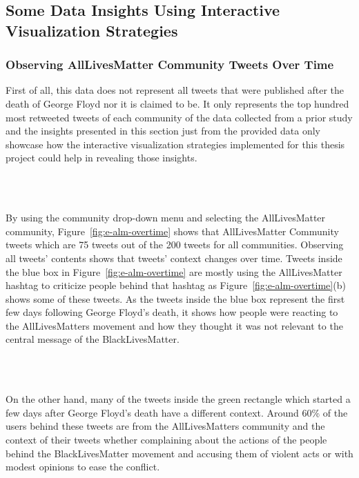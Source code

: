


\subsection{Some Data Insights Using Interactive Visualization Strategies}

\subsubsection{Observing AllLivesMatter Community Tweets Over Time}

First of all, this data does not represent all tweets that were published after the death of George Floyd nor it is claimed to be. It only represents the top hundred most retweeted tweets of each community of the data collected from a prior study and the insights presented in this section just from the provided data only showcase how the interactive visualization strategies implemented for this thesis project could help in revealing those insights. 

\\\

By using the community drop-down menu and selecting the AllLivesMatter community, Figure~\ref{fig:e-alm-overtime} shows that AllLivesMatter Community tweets which are 75 tweets out of the 200 tweets for all communities. Observing all tweets' contents shows that tweets' context changes over time. Tweets inside the blue box in Figure~\ref{fig:e-alm-overtime} are mostly using the AllLivesMatter hashtag to criticize people behind that hashtag as Figure~\ref{fig:e-alm-overtime}(b) shows some of these tweets. As the tweets inside the blue box represent the first few days following George Floyd's death, it shows how people were reacting to the AllLivesMatters movement and how they thought it was not relevant to the central message of the BlackLivesMatter. 

\\\

On the other hand, many of the tweets inside the green rectangle which started a few days after George Floyd's death have a different context. Around 60\% of the users behind these tweets are from the AllLivesMatters community and the context of their tweets whether complaining about the actions of the people behind the BlackLivesMatter movement and accusing them of violent acts or with modest opinions to ease the conflict. 

\\\

